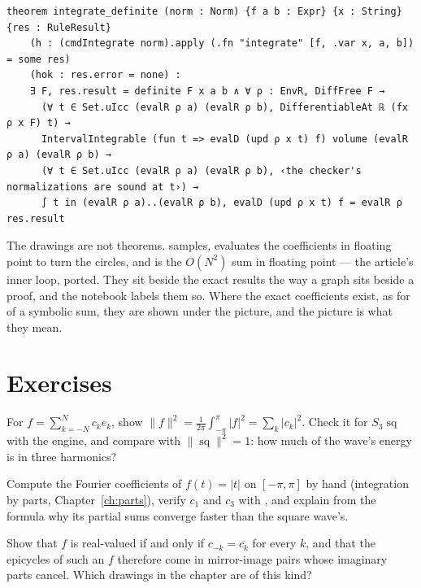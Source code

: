 \begin{verbatim}
theorem integrate_definite (norm : Norm) {f a b : Expr} {x : String} {res : RuleResult}
    (h : (cmdIntegrate norm).apply (.fn "integrate" [f, .var x, a, b]) = some res)
    (hok : res.error = none) :
    ∃ F, res.result = definite F x a b ∧ ∀ ρ : EnvR, DiffFree F →
      (∀ t ∈ Set.uIcc (evalR ρ a) (evalR ρ b), DifferentiableAt ℝ (fx ρ x F) t) →
      IntervalIntegrable (fun t => evalD (upd ρ x t) f) volume (evalR ρ a) (evalR ρ b) →
      (∀ t ∈ Set.uIcc (evalR ρ a) (evalR ρ b), ‹the checker's normalizations are sound at t›) →
      ∫ t in (evalR ρ a)..(evalR ρ b), evalD (upd ρ x t) f = evalR ρ res.result
\end{verbatim}

The drawings are not theorems.  samples,  evaluates the coefficients in
floating point to turn the circles, and  is the $O(N^2)$ sum in floating point --- the
article's inner loop, ported. They sit beside the exact results the way a graph sits beside a
proof, and the notebook labels them so. Where the exact coefficients exist, as for
 of a symbolic sum, they are shown under the picture, and the picture is what they
mean.

\section{Exercises}

\begin{exercisebox}
  For $f = \sum_{k=-N}^{N} c_k e_k$, show $\|f\|^2 = \frac{1}{2\pi}\int_{-\pi}^{\pi}|f|^2 =
  \sum_k |c_k|^2$. Check it for $S_3\operatorname{sq}$ with the engine, and compare with
  $\|\operatorname{sq}\|^2 = 1$: how much of the wave's energy is in three harmonics?
\end{exercisebox}

\begin{exercisebox}
  Compute the Fourier coefficients of $f(t) = |t|$ on $[-\pi, \pi]$ by hand (integration by parts,
  Chapter~\ref{ch:parts}), verify $c_1$ and $c_3$ with , and explain from the
  formula why its partial sums converge faster than the square wave's.
\end{exercisebox}

\begin{exercisebox}
  Show that $f$ is real-valued if and only if $c_{-k} = \overline{c_k}$ for every $k$, and that
  the epicycles of such an $f$ therefore come in mirror-image pairs whose imaginary parts cancel.
  Which drawings in the chapter are of this kind?
\end{exercisebox}

